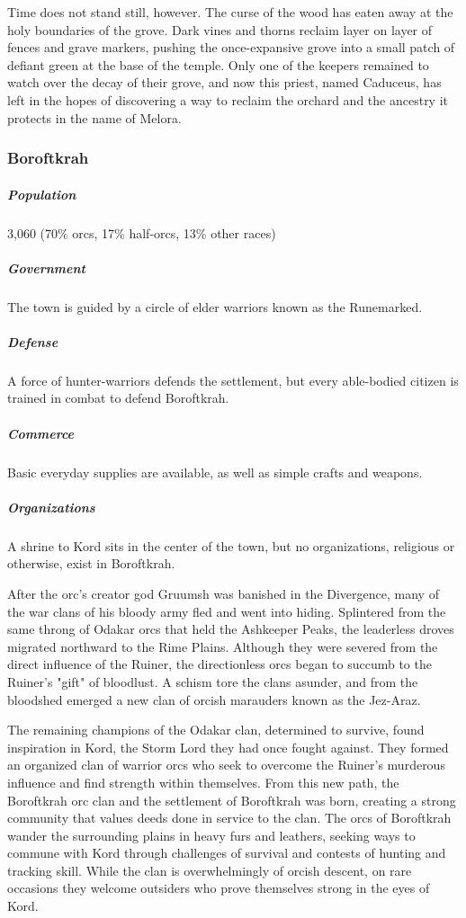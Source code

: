 \documentclass[10pt,a4paper,twoside,bg=print,twocolumn,openany,nodeprecatedcode]{dndbook}
\begin{document}
Time does not stand still, however. The curse of the wood has eaten away at the holy boundaries of the grove. Dark vines and thorns reclaim layer on layer of fences and grave markers, pushing the once-expansive grove into a small patch of defiant green at the base of the temple. Only one of the keepers remained to watch over the decay of their grove, and now this priest, named Caduceus, has left in the hopes of discovering a way to reclaim the orchard and the ancestry it protects in the name of Melora.

\subsubsection{Boroftkrah}
\subparagraph{Population}
3,060 (70\% orcs, 17\% half-orcs, 13\% other races)

\subparagraph{Government}
The town is guided by a circle of elder warriors known as the Runemarked.

\subparagraph{Defense}
A force of hunter-warriors defends the settlement, but every able-bodied citizen is trained in combat to defend Boroftkrah.

\subparagraph{Commerce}
Basic everyday supplies are available, as well as simple crafts and weapons.

\subparagraph{Organizations}
A shrine to Kord sits in the center of the town, but no organizations, religious or otherwise, exist in Boroftkrah.

After the orc's creator god Gruumsh was banished in the Divergence, many of the war clans of his bloody army fled and went into hiding. Splintered from the same throng of Odakar orcs that held the Ashkeeper Peaks, the leaderless droves migrated northward to the Rime Plains. Although they were severed from the direct influence of the Ruiner, the directionless orcs began to succumb to the Ruiner's "gift" of bloodlust. A schism tore the clans asunder, and from the bloodshed emerged a new clan of orcish marauders known as the Jez-Araz.

The remaining champions of the Odakar clan, determined to survive, found inspiration in Kord, the Storm Lord they had once fought against. They formed an organized clan of warrior orcs who seek to overcome the Ruiner's murderous influence and find strength within themselves. From this new path, the Boroftkrah orc clan and the settlement of Boroftkrah was born, creating a strong community that values deeds done in service to the clan. The orcs of Boroftkrah wander the surrounding plains in heavy furs and leathers, seeking ways to commune with Kord through challenges of survival and contests of hunting and tracking skill. While the clan is overwhelmingly of orcish descent, on rare occasions they welcome outsiders who prove themselves strong in the eyes of Kord.
\end{document}
